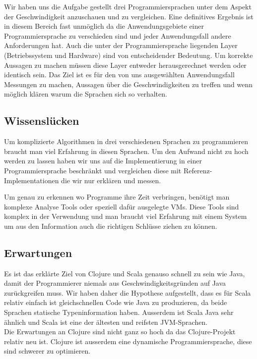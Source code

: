 \documentclass{fancydocument}
\begin{document}
Wir haben uns die Aufgabe gestellt drei Programmiersprachen unter dem
Aspekt der Geschwindigkeit anzuschauen und zu vergleichen. Eine
definitives Ergebnis ist in diesem Bereich fast unmöglich da die
Anwendungsgebiete einer Programmiersprache zu verschieden sind und
jeder Anwendungsfall andere Anforderungen hat. Auch die
unter der Programmiersprache liegenden Layer (Betriebssystem und
Hardware) sind von entscheidender Bedeutung. Um korrekte Aussagen zu
machen m\"ussen diese Layer entweder herausgerechnet werden oder
identisch sein. Das Ziel ist es f\"ur den von uns ausgew\"ahlten Anwendungsfall Messungen
zu machen, Aussagen \"uber die Geschwindigkeiten zu treffen und
wenn m\"oglich kl\"aren warum die Sprachen sich so verhalten.

\subsection{Wissenslücken}

Um komplizierte Algorithmen in drei verschiedenen Sprachen zu
programmieren braucht man viel Erfahrung in diesen Sprachen. Um den
Aufwand nicht zu hoch werden zu lassen haben wir uns auf die
Implementierung in einer Programmiersprache beschränkt und
vergleichen diese mit Referenz-Implementationen die wir nur erklären
und messen.

Um genau zu erkennen wo Programme ihre Zeit verbringen, benötigt man
komplexe Analyse Tools oder speziell dafür ausgelegte VMs. Diese Tools
sind komplex in der Verwendung und man braucht viel Erfahrung mit einem
System um aus den Information auch die richtigen Schlüsse ziehen zu können.

\subsection{Erwartungen}

Es ist das erkl\"arte Ziel von Clojure und
Scala genauso schnell zu sein wie Java, damit der Programmierer niemals aus Geschwindigkeitsgründen auf Java zurückgreifen muss. Wir haben daher die Hypothese aufgestellt, dass es für Scala relativ einfach ist
gleichschnellen Code wie Java zu produzieren, da beide Sprachen 
statische Typeninformation haben. Ausserdem ist Scala Java sehr ähnlich
und Scala ist eine der \"altesten und reifsten JVM-Sprachen.
\\
Die Erwartungen an Clojure sind nicht ganz so hoch da das Clojure-Projekt relativ neu ist. Clojure 
ist ausserdem eine dynamische Programmiersprache, diese sind schwerer zu optimieren.
\end{document}

